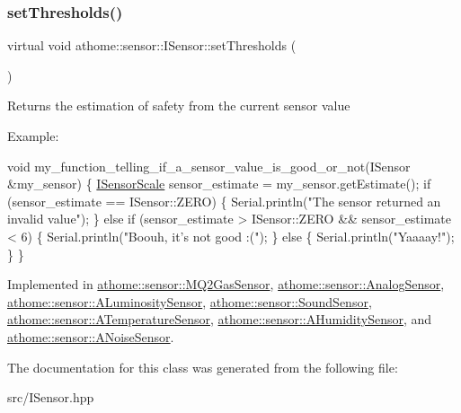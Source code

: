 \subsubsection{\texorpdfstring{set\+Thresholds()}{setThresholds()}}
{\footnotesize\ttfamily virtual void athome\+::sensor\+::\+I\+Sensor\+::set\+Thresholds (\begin{DoxyParamCaption}\item[{const \mbox{\hyperlink{structathome_1_1sensor_1_1_i_sensor_1_1_i_sensor_thresholds}{I\+Sensor\+Thresholds}} \&}]{ }\end{DoxyParamCaption})\hspace{0.3cm}{\ttfamily [pure virtual]}}

Returns the estimation of safety from the current sensor value

Example\+:


\begin{DoxyCode}
\textcolor{keywordtype}{void} my\_function\_telling\_if\_a\_sensor\_value\_is\_good\_or\_not(ISensor
&my\_sensor) \{ \mbox{\hyperlink{classathome_1_1sensor_1_1_i_sensor_aa70bc27a4c17c86caf96cca776541ddf}{ISensorScale}} sensor\_estimate = my\_sensor.getEstimate(); \textcolor{keywordflow}{if}
(sensor\_estimate == ISensor::ZERO) \{ Serial.println(\textcolor{stringliteral}{"The sensor returned an}
\textcolor{stringliteral}{invalid value"});
  \}
  \textcolor{keywordflow}{else} \textcolor{keywordflow}{if} (sensor\_estimate > ISensor::ZERO && sensor\_estimate < 6) \{
    Serial.println(\textcolor{stringliteral}{"Boouh, it's not good :("});
  \}
  \textcolor{keywordflow}{else} \{
    Serial.println(\textcolor{stringliteral}{"Yaaaay!"});
  \}
\}
\end{DoxyCode}
 

Implemented in \mbox{\hyperlink{classathome_1_1sensor_1_1_m_q2_gas_sensor_a69de9f45b9babd2d111b4ce020d7c83e}{athome\+::sensor\+::\+M\+Q2\+Gas\+Sensor}}, \mbox{\hyperlink{classathome_1_1sensor_1_1_analog_sensor_addcdb79aa03b7b6e386bc9c59faced10}{athome\+::sensor\+::\+Analog\+Sensor}}, \mbox{\hyperlink{classathome_1_1sensor_1_1_a_luminosity_sensor_aa26ed7176ba600f6900bd249edce71ab}{athome\+::sensor\+::\+A\+Luminosity\+Sensor}}, \mbox{\hyperlink{classathome_1_1sensor_1_1_sound_sensor_adaf42abe0443f486361656efe9587ba7}{athome\+::sensor\+::\+Sound\+Sensor}}, \mbox{\hyperlink{classathome_1_1sensor_1_1_a_temperature_sensor_a1c323184ac116784e877151895dfd080}{athome\+::sensor\+::\+A\+Temperature\+Sensor}}, \mbox{\hyperlink{classathome_1_1sensor_1_1_a_humidity_sensor_a1a19bfee3db6b0940f1329b42d7ed0d0}{athome\+::sensor\+::\+A\+Humidity\+Sensor}}, and \mbox{\hyperlink{classathome_1_1sensor_1_1_a_noise_sensor_a8429e91e9f8b2e1634a405780f456beb}{athome\+::sensor\+::\+A\+Noise\+Sensor}}.



The documentation for this class was generated from the following file\+:\begin{DoxyCompactItemize}
\item 
src/I\+Sensor.\+hpp\end{DoxyCompactItemize}
